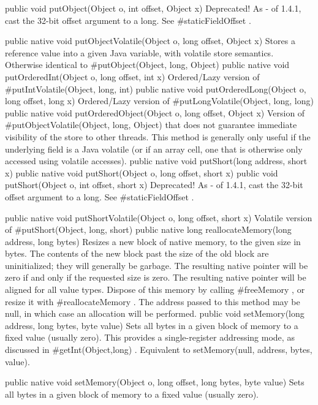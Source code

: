  public  void putObject(Object o,
    int offset,
    Object x) 
Deprecated! As - of 1.4.1, cast the 32-bit offset argument to a long. See #staticFieldOffset .

 public native  void putObjectVolatile(Object o,
    long offset,
    Object x)
Stores a reference value into a given Java variable, with
volatile store semantics. Otherwise identical to #putObject(Object, long, Object) 
 public native  void putOrderedInt(Object o,
    long offset,
    int x)
Ordered/Lazy version of #putIntVolatile(Object, long, int) 
 public native  void putOrderedLong(Object o,
    long offset,
    long x)
Ordered/Lazy version of #putLongVolatile(Object, long, long) 
 public native  void putOrderedObject(Object o,
    long offset,
    Object x)
Version of #putObjectVolatile(Object, long, Object) 
that does not guarantee immediate visibility of the store to
other threads. This method is generally only useful if the
underlying field is a Java volatile (or if an array cell, one
that is otherwise only accessed using volatile accesses).
 public native  void putShort(long address,
    short x)
 public native  void putShort(Object o,
    long offset,
    short x)
 public  void putShort(Object o,
    int offset,
    short x) 
Deprecated! As - of 1.4.1, cast the 32-bit offset argument to a long. See #staticFieldOffset .

 public native  void putShortVolatile(Object o,
    long offset,
    short x)
Volatile version of #putShort(Object, long, short) 
 public native long reallocateMemory(long address,
    long bytes)
Resizes a new block of native memory, to the given size in bytes.  The
contents of the new block past the size of the old block are
uninitialized; they will generally be garbage.  The resulting native
pointer will be zero if and only if the requested size is zero.  The
resulting native pointer will be aligned for all value types.  Dispose
of this memory by calling #freeMemory , or resize it with #reallocateMemory .  The address passed to this method may be null, in
which case an allocation will be performed.
 public  void setMemory(long address,
    long bytes,
    byte value) 
Sets all bytes in a given block of memory to a fixed value (usually zero). This provides a single-register addressing mode, as discussed in #getInt(Object,long) .
Equivalent to setMemory(null, address, bytes, value).

 public native  void setMemory(Object o,
    long offset,
    long bytes,
    byte value)
Sets all bytes in a given block of memory to a fixed value
(usually zero).

